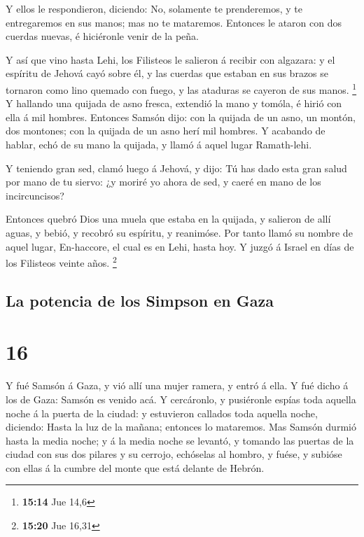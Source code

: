  Y ellos le respondieron, diciendo: No, solamente te
prenderemos, y te entregaremos en sus manos; mas no te mataremos.
Entonces le ataron con dos cuerdas nuevas, é hiciéronle venir de la
peña.

 Y así que vino hasta Lehi, los Filisteos le salieron á
recibir con algazara: y el espíritu de Jehová cayó sobre él, y las
cuerdas que estaban en sus brazos se tornaron como lino quemado con
fuego, y las ataduras se cayeron de sus manos. \footnote{\textbf{15:14}
  Jue 14,6}  Y hallando una quijada de asno fresca,
extendió la mano y tomóla, é hirió con ella á mil hombres.
 Entonces Samsón dijo: con la quijada de un asno, un
montón, dos montones; con la quijada de un asno herí mil hombres.
 Y acabando de hablar, echó de su mano la quijada, y
llamó á aquel lugar Ramath-lehi.

 Y teniendo gran sed, clamó luego á Jehová, y dijo: Tú
has dado esta gran salud por mano de tu siervo: ¿y moriré yo ahora de
sed, y caeré en mano de los incircuncisos?

 Entonces quebró Dios una muela que estaba en la quijada,
y salieron de allí aguas, y bebió, y recobró su espíritu, y reanimóse.
Por tanto llamó su nombre de aquel lugar, En-haccore, el cual es en
Lehi, hasta hoy.  Y juzgó á Israel en días de los
Filisteos veinte años. \footnote{\textbf{15:20} Jue 16,31}

\hypertarget{la-potencia-de-los-simpson-en-gaza}{%
\subsection{La potencia de los Simpson en
Gaza}\label{la-potencia-de-los-simpson-en-gaza}}

\hypertarget{section-15}{%
\section{16}\label{section-15}}

 Y fué Samsón á Gaza, y vió allí una mujer ramera, y entró
á ella.  Y fué dicho á los de Gaza: Samsón es venido acá.
Y cercáronlo, y pusiéronle espías toda aquella noche á la puerta de la
ciudad: y estuvieron callados toda aquella noche, diciendo: Hasta la luz
de la mañana; entonces lo mataremos.  Mas Samsón durmió
hasta la media noche; y á la media noche se levantó, y tomando las
puertas de la ciudad con sus dos pilares y su cerrojo, echóselas al
hombro, y fuése, y subióse con ellas á la cumbre del monte que está
delante de Hebrón.


